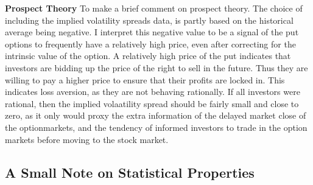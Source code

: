 \textbf{Prospect Theory} To make a brief comment on prospect theory. The choice of including the implied volatility spreads data, is partly based on the historical average being negative. I interpret this negative value to be a signal of the put options to frequently have a relatively high price, even after correcting for the intrinsic value of the option. A relatively high price of the put indicates that investors are bidding up the price of the  right to sell in the future. Thus they are willing to pay a higher price to ensure that their profits are locked in. This indicates loss aversion, as they are not behaving rationally. If all investors were rational, then the implied volaatility spread should be fairly small and close to zero, as it only would proxy the extra information of the delayed market close of the optionmarkets, and the tendency of informed investors to trade in the option markets before moving to the stock market.







\subsection{A Small Note on Statistical Properties}

